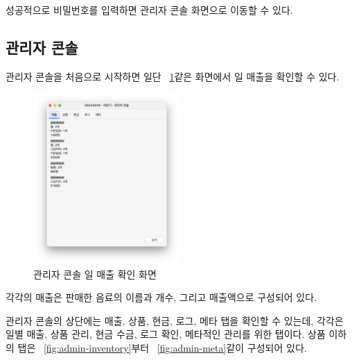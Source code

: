 \documentclass{oblivoir}
\newcommand{\figref}[1]{\figurename~\ref{#1}}
\begin{document}
    성공적으로 비밀번호를 입력하면 관리자 콘솔 화면으로 이동할 수 있다.

    \subsection{관리자 콘솔}

    관리자 콘솔을 처음으로 시작하면 일단 \figref{fig:admin-daily-log}\와 같은 화면에서 일 매출을 확인할 수 있다.
    \begin{figure}[h]
        \centering
        \includegraphics[width=0.5\textwidth]{images/snapshot/admin-daily-log}
        \caption{관리자 콘솔 일 매출 확인 화면}
        \label{fig:admin-daily-log}
    \end{figure}
    각각의 매출은 판매한 음료의 이름과 개수, 그리고 매출액으로 구성되어 있다.

    관리자 콘솔의 상단에는 매출, 상품, 현금, 로그, 메타 탭을 확인할 수 있는데,
    각각은 일별 매출, 상품 관리, 현금 수금, 로그 확인, 메타적인 관리를 위한 탭이다.
    상품 이하의 탭은 \figref{fig:admin-inventory}부터 \figref{fig:admin-meta}\와 같이 구성되어 있다.
\end{document}
